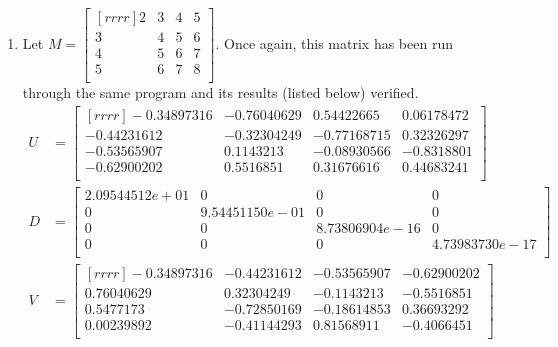 \documentclass[12pt]{article}
\theoremstyle{definition}
\theoremstyle{plain}
\begin{document}
\begin{enumerate}
\begin{enumerate}
	\item Let $M=\begin{bmatrix}[rrrr]2&3&4&5\\3&4&5&6\\4&5&6&7\\5&6&7&8\\\end{bmatrix}$. Once again, this matrix has been run through the same program and its results (listed below) verified.
	\begin{align*}
	U&=\begin{bmatrix}[rrrr]
	-0.34897316 & -0.76040629 & 0.54422665 & 0.06178472\\
	-0.44231612 & -0.32304249 & -0.77168715 & 0.32326297\\
	-0.53565907 & 0.1143213 & -0.08930566 & -0.8318801\\
	-0.62900202 & 0.5516851 &  0.31676616 & 0.44683241\\\end{bmatrix}\\
	D&=\begin{bmatrix}
	2.09544512e+01 & 0 & 0 & 0\\
	0 & 9.54451150e-01 & 0 & 0\\
	0 & 0 & 8.73806904e-16 & 0\\
	0 & 0 & 0 & 4.73983730e-17\\\end{bmatrix}\\
	V&=\begin{bmatrix}[rrrr]
	-0.34897316 & -0.44231612 & -0.53565907 & -0.62900202\\
	0.76040629 & 0.32304249 & -0.1143213  & -0.5516851\\
	0.5477173 & -0.72850169 & -0.18614853 & 0.36693292\\
	0.00239892 & -0.41144293 & 0.81568911 & -0.4066451\\\end{bmatrix}
	\end{align*}
	\end{enumerate}






\end{enumerate}
\end{document}
